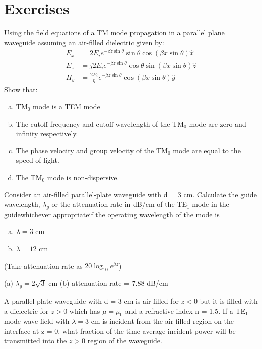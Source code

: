 \section*{Exercises}
\begin{ExerciseList}
\Exercise[label={ex361}]
Using the field equations of a TM mode propagation in a parallel plane waveguide assuming an air-filled dielectric given by:
\begin{align*}
E_x &= 2E_ie^{-\beta z\sin\theta}\sin\theta\cos(\beta x\sin\theta)\hat{x}\\
E_z &= j2E_ie^{-\beta z\sin\theta}\cos\theta\sin(\beta x\sin\theta)\hat{z}\\
H_y &= \frac{2E_i}{\eta}e^{-\beta z\sin\theta}\cos(\beta x\sin\theta)\hat{y}
\end{align*}
Show that:
\begin{enumerate}[(a)]
\item TM$_0$ mode is a TEM mode
\item The cutoff frequency and cutoff wavelength of the TM$_0$ mode are zero and infinity respectively.
\item The phase velocity and group velocity of the TM$_0$ mode are equal to the speed of light.
\item The TM$_0$ mode is non-dispersive.
\end{enumerate}

\Exercise[label={ex362}]
Consider an air-filled parallel-plate waveguide with d = 3 cm. Calculate the guide wavelength, $\lambda_g$ or the attenuation rate in dB/cm of the TE$_1$ mode in the guide\textemdash whichever appropriate\textemdash if the operating wavelength of the mode is
\begin{enumerate}[(a)]
\item $\lambda = 3$ cm
\item $\lambda = 12$ cm
\end{enumerate}
(Take attenuation rate as $20\log_{10} e^{\bar{\beta}z}$)

\Answer[ref={ex362}]
(a) $\lambda_g = 2\sqrt{3}$ cm (b) attenuation rate = 7.88 dB/cm

\Exercise[label={ex363}]
A parallel-plate waveguide with d = 3 cm is air-filled for $z < 0$ but it is filled with a dielectric for $z > 0$ which has $\mu = \mu_0$ and a refractive index n = 1.5. If a TE$_1$ mode wave field with $\lambda = 3$ cm is incident from the air filled region on the interface at z = 0, what fraction of the time-average incident power will be transmitted into the $z > 0$ region of the waveguide.

\end{ExerciseList}
